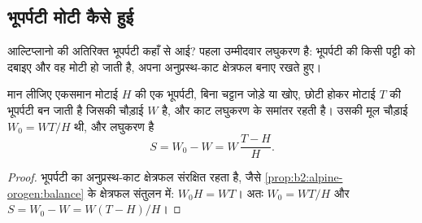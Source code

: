 \begin{omfigure}
\par{}
\end{omfigure}

\subsection{भूपर्पटी मोटी कैसे हुई}

आल्टिप्लानो की अतिरिक्त भूपर्पटी कहाँ से आई? पहला उम्मीदवार लघुकरण है:
भूपर्पटी की किसी पट्टी को दबाइए और वह मोटी हो जाती है, अपना अनुप्रस्थ-काट क्षेत्रफल बनाए रखते हुए।

\begin{proposition}[लघुकरण द्वारा स्थूलन]\label{prop:b2:himalaya-andes:shortening}
मान लीजिए एकसमान मोटाई $H$ की एक भूपर्पटी, बिना चट्टान जोड़े या खोए, छोटी होकर मोटाई $T$ की
भूपर्पटी बन जाती है जिसकी चौड़ाई $W$ है, और काट लघुकरण के समांतर रहती है। उसकी
मूल चौड़ाई $W_0 = W T/H$ थी, और लघुकरण है
\[
  S = W_0 - W = W\,\frac{T - H}{H} .
\]
\end{proposition}

\begin{proof}
भूपर्पटी का अनुप्रस्थ-काट क्षेत्रफल संरक्षित रहता है, जैसे \cref{prop:b2:alpine-orogen:balance} के
क्षेत्रफल संतुलन में: $W_0 H = W T$। अतः $W_0 = WT/H$ और $S = W_0 - W =
W(T - H)/H$।
\end{proof}

